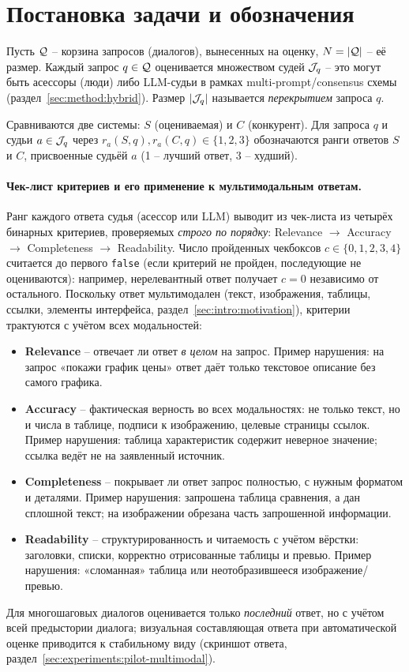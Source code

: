 \section{Постановка задачи и обозначения}
\label{sec:method:notation}

Пусть $\mathcal{Q}$ -- корзина запросов (диалогов), вынесенных на оценку,
$N = \left\lvert\mathcal{Q}\right\rvert$ -- её размер.
Каждый запрос $q \in \mathcal{Q}$ оценивается множеством судей $\mathcal{J}_q$ --
это могут быть асессоры (люди) либо LLM-судьи в рамках
multi-prompt/consensus схемы (раздел~\ref{sec:method:hybrid}).
Размер $\left\lvert\mathcal{J}_q\right\rvert$ называется \emph{перекрытием} запроса $q$.

Сравниваются две системы: $S$ (оцениваемая) и $C$ (конкурент).
Для запроса $q$ и судьи $a \in \mathcal{J}_q$ через
$r_a(S, q), r_a(C, q) \in \{1, 2, 3\}$ обозначаются ранги ответов
$S$ и $C$, присвоенные судьёй $a$ (1 -- лучший ответ, 3 -- худший).

\paragraph{Чек-лист критериев и его применение к мультимодальным ответам.}
Ранг каждого ответа судья (асессор или LLM) выводит из чек-листа из
четырёх бинарных критериев, проверяемых \emph{строго по порядку}:
Relevance $\to$ Accuracy $\to$ Completeness $\to$ Readability.
Число пройденных чекбоксов $c \in \{0,1,2,3,4\}$ считается до первого
\texttt{false} (если критерий не пройден, последующие не оцениваются):
например, нерелевантный ответ получает $c = 0$ независимо от остального.
Поскольку ответ мультимодален (текст, изображения, таблицы, ссылки,
элементы интерфейса, раздел~\ref{sec:intro:motivation}), критерии
трактуются с учётом всех модальностей:
\begin{itemize}
    \item \textbf{Relevance} -- отвечает ли ответ \emph{в целом} на
        запрос. Пример нарушения: на запрос «покажи график цены» ответ
        даёт только текстовое описание без самого графика.
    \item \textbf{Accuracy} -- фактическая верность во всех модальностях:
        не только текст, но и числа в таблице, подписи к изображению,
        целевые страницы ссылок. Пример нарушения: таблица характеристик
        содержит неверное значение; ссылка ведёт не на заявленный
        источник.
    \item \textbf{Completeness} -- покрывает ли ответ запрос полностью, с
        нужным форматом и деталями. Пример нарушения: запрошена таблица
        сравнения, а дан сплошной текст; на изображении обрезана часть
        запрошенной информации.
    \item \textbf{Readability} -- структурированность и читаемость с
        учётом вёрстки: заголовки, списки, корректно отрисованные
        таблицы и превью. Пример нарушения: «сломанная» таблица или
        неотобразившееся изображение/превью.
\end{itemize}
Для многошаговых диалогов оценивается только \emph{последний} ответ, но
с учётом всей предыстории диалога; визуальная составляющая ответа при
автоматической оценке приводится к стабильному виду (скриншот ответа,
раздел~\ref{sec:experiments:pilot-multimodal}).

